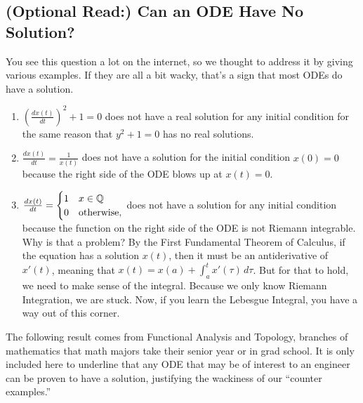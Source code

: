 \subsection{(Optional Read:) Can an ODE Have No Solution?}
\label{sec:ODEwithNoSolutions}

You see this question a lot on the internet, so we thought to address it by giving various examples. If they are all a bit wacky, that's a sign that most ODEs do have a solution.
 \begin{enumerate}
\renewcommand{\labelenumi}{(\alph{enumi})}
\setlength{\itemsep}{.2cm}
    \item $\left(\frac{dx(t)}{dt}\right)^2 + 1 = 0$ does not have a real solution for any initial condition for the same reason that $y^2+1 = 0$ has no real solutions.

    \item  $\frac{dx(t)}{dt} = \frac{1}{x(t)}$ does not have a solution for the initial condition $x(0) = 0$ because the right side of the ODE blows up at $x(t)=0$.

        \item  $\frac{dx(t)}{dt} = \begin{cases}
    1 & x \in \mathbb Q \\
    0 & \text{otherwise},         
    \end{cases}$ does not have a solution for any initial condition because the function on the right side of the ODE is not Riemann integrable. Why is that a problem? By the First Fundamental Theorem of Calculus, if the equation has a solution $x(t)$, then it must be an antiderivative of $x'(t)$, meaning that $x(t) = x(a) + \int_a^t x'(\tau)\, d\tau$. But for that to hold, we need to make sense of the integral. Because we only know Riemann Integration, we are stuck. Now, if you learn the Lebesgue Integral, you have a way out of this corner.
\end{enumerate}

The following result comes from Functional Analysis and Topology, branches of mathematics that math majors take their senior year or in grad school. It is only included here to underline that any ODE that may be of interest to an engineer can be proven to have a solution, justifying the wackiness of our ``counter examples.''\\



